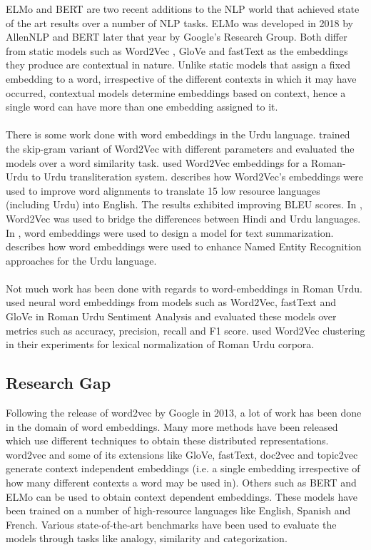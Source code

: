 \documentclass[format=acmsmall,review=true,screen=true]{acmart}
\begin{document}
    ELMo \cite{peters2018deep} and BERT \cite{devlin2018bert} are two recent additions to the NLP world that achieved state of the art results over a number of NLP tasks. ELMo was developed in 2018 by AllenNLP and BERT later that year by Google’s Research Group. Both differ from static models such as Word2Vec , GloVe  and fastText as the embeddings they produce are contextual in nature. Unlike static models that assign a fixed embedding to a word, irrespective of the different contexts in which it may have occurred, contextual models determine embeddings based on context, hence a single word can have more than one embedding assigned to it. \\\\
    There is some work done with word embeddings in the Urdu language. \cite{haider2018urdu} trained the skip-gram variant of Word2Vec with different parameters and evaluated the models over a word similarity task. \cite{alam2017sequence} used Word2Vec embeddings for a Roman-Urdu to Urdu transliteration system. \cite{pourdamghani2018using} describes how Word2Vec's embeddings were used to improve word alignments to translate 15 low resource languages (including Urdu) into English. The results exhibited improving BLEU scores. In \cite{bhat2016house}, Word2Vec was used to bridge the differences between Hindi and Urdu languages. In \cite{shahid2019rewriter}, word embeddings were used to design a model for text summarization. \cite{khan2019deep} describes how word embeddings were used to enhance Named Entity Recognition approaches for the Urdu language. \\\\
    Not much work has been done with regards to word-embeddings in Roman Urdu. \cite{memood2020precisely} used neural word embeddings from models such as Word2Vec, fastText and GloVe in Roman Urdu Sentiment Analysis and evaluated these models over metrics such as accuracy, precision, recall and F1 score. \cite{khan2020clustering} used Word2Vec clustering in their experiments for lexical normalization of Roman Urdu corpora. 
    \subsection{Research Gap} 
    Following the release of word2vec by Google in 2013, a lot of work has been done in the domain of word embeddings. Many more methods have been released which use different techniques to obtain these distributed representations. word2vec and some of its extensions like GloVe, fastText, doc2vec and topic2vec generate context independent embeddings (i.e. a single embedding irrespective of how many different contexts a word may be used in). Others such as BERT and ELMo can be used to obtain context dependent embeddings. These models have been trained on a number of high-resource languages like English, Spanish and French. Various state-of-the-art benchmarks have been used to evaluate the models through tasks like analogy, similarity and categorization.\\
    
\end{document}
